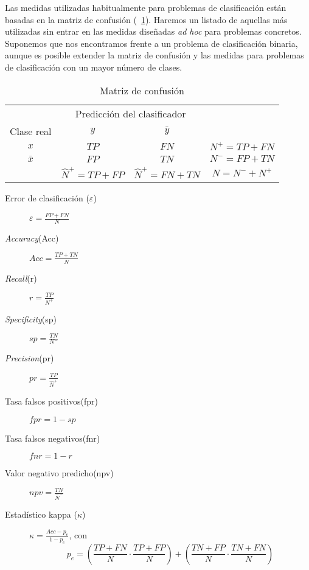 	Las medidas utilizadas habitualmente para problemas de clasificación están basadas en la matriz de confusión (~\ref{tab:matrizconfusion}). Haremos un listado de aquellas más utilizadas sin entrar en las medidas diseñadas \textit{ad hoc} para problemas concretos. Suponemos que nos encontramos frente a un problema de clasificación binaria, aunque es posible extender la matriz de confusión y las medidas para problemas de clasificación con un mayor número de clases.

\begin{table}[H]
\centering
\begin{tabular}{cccc}
\cline{1-3}
\multicolumn{1}{|c|}{}           & \multicolumn{2}{c|}{Predicción del clasificador}      &                 \\ \cline{1-3}
\multicolumn{1}{|c|}{Clase real} & \multicolumn{1}{c|}{$y$}    & \multicolumn{1}{c|}{$\bar{y}$}    &                 \\ \cline{1-3}
\multicolumn{1}{|c|}{$x$}          & \multicolumn{1}{c|}{$TP$} & \multicolumn{1}{c|}{$FN$} & $N^+ = TP + FN$ \\ \cline{1-3}
\multicolumn{1}{|c|}{$\bar{x}$}          & \multicolumn{1}{c|}{$FP$} & \multicolumn{1}{c|}{$TN$} & $N^- = FP + TN$ \\ \cline{1-3}
                                & $\hat{N}^+ = TP + FP$     & $\hat{N}^+ = FN + TN$     &   $N = N^- + N^+$             
\end{tabular}
\caption{Matriz de confusión}
\label{tab:matrizconfusion}
\end{table} 
	
\begin{description}
	\item[Error de clasificación ($\varepsilon$)] $\varepsilon = \frac{FP+FN}{N}$
	\item[\textit{Accuracy}(Acc)] $Acc=\frac{TP+TN}{N}$
	\item[\textit{Recall}(r)] $r=\frac{TP}{N^+}$
	\item[\textit{Specificity}(sp)] $sp=\frac{TN}{N^-}$
	\item[\textit{Precision}(pr)] $pr=\frac{TP}{\hat{N}^+}$
	\item[Tasa falsos positivos(fpr)] $fpr=1-sp$
	\item[Tasa falsos negativos(fnr)] $fnr=1-r$
	\item[Valor negativo predicho(npv)] $npv=\frac{TN}{\hat{N}^-}$
	\item[Estadístico kappa ($\kappa$)] $\kappa = \frac{Acc-p_e}{1-p_e}$, con 
	\[ p_e = 
		\left( \frac{TP+FN}{N} \cdot \frac{TP+FP}{N} \right) + 
		\left( \frac{TN+FP}{N} \cdot \frac{TN+FN}{N} \right)  \] 
\end{description}
	

